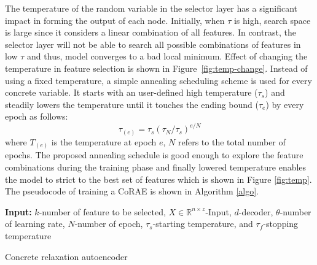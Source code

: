 \documentclass{bioinfo}
\newcommand{\R}{\mathbb{R}}
\begin{document}
The temperature of the random variable in the selector layer has a significant impact in forming the output of each node. Initially, when $\tau$ is high, search space is large since it considers a linear combination of all features. In contrast, the selector layer will not be able to search all possible combinations of features in low $\tau$ and thus, model converges to a bad local minimum. Effect of changing the temperature in feature selection is shown in Figure~\ref{fig:temp-change}. Instead of using a fixed temperature, a simple annealing scheduling scheme is used for every concrete variable. It starts with an user-defined high temperature ($\tau_s$) and steadily lowers the temperature until it touches the ending bound ($\tau_e$) by every epoch as follows: 
\begin{equation}
\tau_{(e)} = \tau_s(\tau_N/\tau_s)^{e/N}
\end{equation}
where $T_{(e)}$ is the temperature at epoch $e$, $N$ refers to the total number of epochs. The proposed annealing schedule is good enough to explore the feature combinations during the training phase and finally lowered temperature enables the model to strict to the best set of features which is shown in Figure \ref{fig:temp}. The pseudocode of training a CoRAE is shown in Algorithm \ref{algo}.
\begin{algorithm}[h]
\SetAlgoLined
\textbf{Input:} $k$-number of feature to be selected,  $X \in \R^{n \times z}$-Input, $d$-decoder, $\theta$-number of learning rate, $N$-number of epoch, $\tau_s$-starting temperature, and $\tau_f$-stopping temperature \\
 \caption{Concrete relaxation autoencoder}
 \label{algo}
\end{algorithm}
\end{document}

